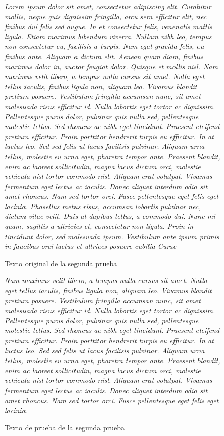 \documentclass[12pt,twoside]{article}
\begin{document}
\begin{figure}
    \centering
    \textit{Lorem ipsum dolor sit amet, consectetur adipiscing elit. 
Curabitur mollis, neque quis dignissim fringilla, arcu sem 
efficitur elit, nec finibus dui felis sed augue. In et consectetur 
felis, venenatis mattis ligula. Etiam maximus bibendum viverra. 
Nullam nibh leo, tempus non consectetur eu, facilisis a turpis. 
Nam eget gravida felis, eu finibus ante. Aliquam a dictum elit. 
Aenean quam diam, finibus maximus dolor in, auctor feugiat dolor. 
Quisque et mollis nisl. Nam maximus velit libero, a tempus nulla 
cursus sit amet. Nulla eget tellus iaculis, finibus ligula non, 
aliquam leo. Vivamus blandit pretium posuere. Vestibulum fringilla 
accumsan nunc, sit amet malesuada risus efficitur id. Nulla 
lobortis eget tortor ac dignissim. Pellentesque purus dolor, 
pulvinar quis nulla sed, pellentesque molestie tellus. 
Sed rhoncus ac nibh eget tincidunt.}
\textit{
Praesent eleifend pretium efficitur. Proin porttitor hendrerit 
turpis eu efficitur. In at luctus leo. Sed sed felis ut lacus 
facilisis pulvinar. Aliquam urna tellus, molestie eu urna eget, 
pharetra tempor ante. Praesent blandit, enim ac laoreet sollicitudin, 
magna lacus dictum orci, molestie vehicula nisl tortor commodo nisl. 
Aliquam erat volutpat. Vivamus fermentum eget lectus ac iaculis. 
Donec aliquet interdum odio sit amet rhoncus. Nam sed tortor orci. 
Fusce pellentesque eget felis eget lacinia. Phasellus metus risus, 
accumsan lobortis pulvinar nec, dictum vitae velit. Duis at dapibus 
tellus, a commodo dui. Nunc mi quam, sagittis a ultricies et, 
consectetur non ligula. Proin in tincidunt dolor, sed malesuada 
ipsum. Vestibulum ante ipsum primis in faucibus orci luctus et 
ultrices posuere cubilia Curae}
    \caption{Texto original de la segunda prueba}
    \label{fig:texto21}
\end{figure}

\begin{figure}
    \centering
    \textit{Nam maximus velit libero, a tempus nulla 
cursus sit amet. Nulla eget tellus iaculis, finibus ligula non, 
aliquam leo. Vivamus blandit pretium posuere. Vestibulum fringilla 
accumsan nunc, sit amet malesuada risus efficitur id. Nulla 
lobortis eget tortor ac dignissim. Pellentesque purus dolor, 
pulvinar quis nulla sed, pellentesque molestie tellus. 
Sed rhoncus ac nibh eget tincidunt.}
\textit{Praesent eleifend pretium efficitur. Proin porttitor hendrerit 
turpis eu efficitur. In at luctus leo. Sed sed felis ut lacus 
facilisis pulvinar. Aliquam urna tellus, molestie eu urna eget, 
pharetra tempor ante. Praesent blandit, enim ac laoreet sollicitudin, 
magna lacus dictum orci, molestie vehicula nisl tortor commodo nisl. 
Aliquam erat volutpat. Vivamus fermentum eget lectus ac iaculis. 
Donec aliquet interdum odio sit amet rhoncus. Nam sed tortor orci. 
Fusce pellentesque eget felis eget lacinia.}
    \caption{Texto de prueba de la segunda prueba}
    \label{fig:texto22}
\end{figure}
\end{document}
